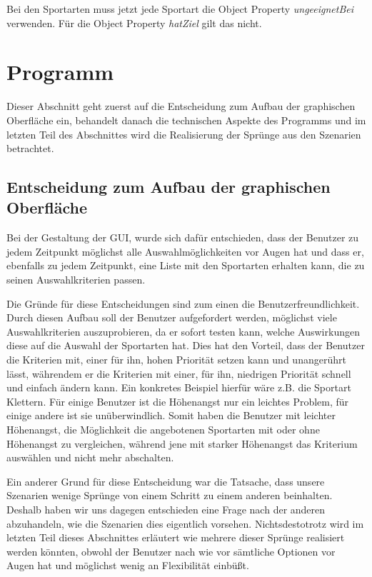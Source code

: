 Bei den Sportarten muss jetzt jede Sportart die Object Property \textit{ungeeignetBei} verwenden. F\"ur die Object Property \textit{hatZiel} gilt das nicht.




\section{Programm}

Dieser Abschnitt geht zuerst auf die Entscheidung zum Aufbau der graphischen Oberfläche ein, behandelt danach die technischen Aspekte des Programms und im letzten Teil des Abschnittes wird die Realisierung der Sprünge aus den Szenarien betrachtet. 

\subsection{Entscheidung zum Aufbau der graphischen Oberfläche}

Bei der Gestaltung der GUI, wurde sich dafür entschieden, dass der Benutzer zu jedem Zeitpunkt möglichst alle Auswahlmöglichkeiten vor Augen hat und dass er, ebenfalls zu jedem Zeitpunkt, eine Liste mit den Sportarten erhalten kann, die zu seinen Auswahlkriterien passen.

Die Gründe für diese Entscheidungen sind zum einen die Benutzerfreundlichkeit. Durch diesen Aufbau soll der Benutzer aufgefordert werden, möglichst viele Auswahlkriterien auszuprobieren, da er sofort testen kann, welche Auswirkungen diese auf die Auswahl der Sportarten hat. Dies hat den Vorteil, dass der Benutzer die Kriterien mit, einer für ihn, hohen Priorität setzen kann und unangerührt lässt, währendem er die Kriterien mit einer, für ihn, niedrigen Priorität schnell und einfach ändern kann. Ein konkretes Beispiel hierfür wäre z.B. die Sportart Klettern. Für einige Benutzer ist die Höhenangst nur ein leichtes Problem, für einige andere ist sie unüberwindlich. Somit haben die Benutzer mit leichter Höhenangst, die Möglichkeit die angebotenen Sportarten mit oder ohne Höhenangst zu vergleichen, während jene mit starker Höhenangst das Kriterium auswählen und nicht mehr abschalten.

Ein anderer Grund für diese Entscheidung war die Tatsache, dass unsere Szenarien wenige Sprünge von einem Schritt zu einem anderen beinhalten. Deshalb haben wir uns dagegen entschieden eine Frage nach der anderen abzuhandeln, wie die Szenarien dies eigentlich vorsehen. Nichtsdestotrotz wird im letzten Teil dieses Abschnittes erläutert wie mehrere dieser Sprünge realisiert werden könnten, obwohl der Benutzer nach wie vor sämtliche Optionen vor Augen hat und möglichst wenig an Flexibilität einbüßt.

